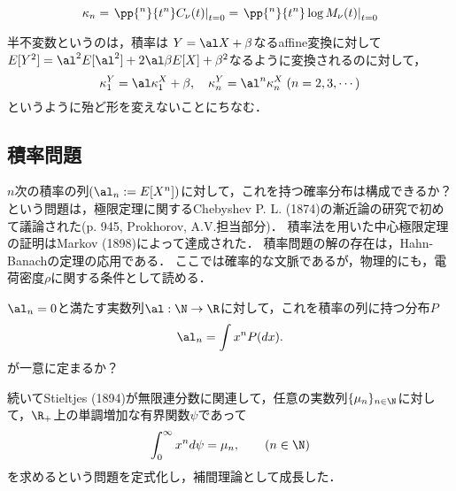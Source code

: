 \documentclass[uplatex,dvipdfmx]{jsreport}
\begin{document}
\begin{proposition}
    \[\kappa_n=\left.\pp{^n}{t^n}C_\nu(t)\right|_{t=0}=\left.\pp{^n}{t^n}\log M_\nu(t)\right|_{t=0}\]
\end{proposition}

\begin{remark}[affine変換に対する半不変性]
    半不変数というのは，積率は
    $Y=\al X+\beta$なるaffine変換に対して
    $E[Y^2]=\al^2 E[\al^2]+2\al\beta E[X]+\beta^2$なるように変換されるのに対して，
    \[\kappa_1^Y=\al\kappa_1^X+\beta,\quad\kappa_n^Y=\al^n\kappa_n^X\;(n=2,3,\cdots)\]
    というように殆ど形を変えないことにちなむ．
\end{remark}

\begin{example}
    
\end{example}

\subsection{積率問題}

\begin{tcolorbox}[colframe=ForestGreen, colback=ForestGreen!10!white,breakable,colbacktitle=ForestGreen!40!white,coltitle=black,fonttitle=\bfseries\sffamily,
title=]
    $n$次の積率の列$(\al_n:=E[X^n])$に対して，これを持つ確率分布は構成できるか？という問題は，極限定理に関するChebyshev P. L. (1874)の漸近論の研究で初めて議論された(\cite{Hazewinkel89-EncyclopaediaOfMath3}p. 945, Prokhorov, A.V.担当部分)．
    積率法を用いた中心極限定理の証明はMarkov (1898)によって達成された．
    積率問題の解の存在は，Hahn-Banachの定理の応用である．
    ここでは確率的な文脈であるが，物理的にも，電荷密度$\rho$に関する条件として読める．
\end{tcolorbox}

\begin{problem}
    $\al_n=0$と満たす実数列$\al:\N\to\R$に対して，これを積率の列に持つ分布$P$
    \[\al_n=\int x^nP(dx).\]
    が一意に定まるか？
\end{problem}
\begin{history}
    続いてStieltjes (1894)が無限連分数に関連して，任意の実数列$\{\mu_n\}_{n\in\N}$に対して，$\R_+$上の単調増加な有界関数$\psi$であって
    \[\int^\infty_0x^nd\psi=\mu_n,\qquad(n\in\N)\]
    を求めるという問題を定式化し，補間理論として成長した．
\end{history}
\end{document}
